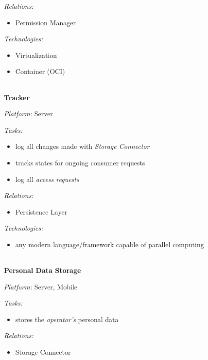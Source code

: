 \documentclass[12pt,english,a4paper,titlepage,cleardoublepage=empty,dottedtoc]{report}
\providecommand{\tightlist}{%
  \setlength{\itemsep}{0pt}\setlength{\parskip}{0pt}}
\begin{document}
\emph{Relations:}

\begin{itemize}
\tightlist
\item
  Permission Manager
\end{itemize}

\emph{Technologies:}

\begin{itemize}
\tightlist
\item
  Virtualization
\item
  Container (OCI)
\end{itemize}

~\\
\textbf{Tracker}

\emph{Platform:} Server

\emph{Tasks:}

\begin{itemize}
\tightlist
\item
  log all changes made with \emph{Storage Connector}
\item
  tracks states for ongoing consumer requests
\item
  log all \emph{access requests}
\end{itemize}

\emph{Relations:}

\begin{itemize}
\tightlist
\item
  Persistence Layer
\end{itemize}

\emph{Technologies:}

\begin{itemize}
\tightlist
\item
  any modern language/framework capable of parallel computing
\end{itemize}

~\\
\textbf{Personal Data Storage}

\emph{Platform:} Server, Mobile

\emph{Tasks:}

\begin{itemize}
\tightlist
\item
  stores the \emph{operator's} personal data
\end{itemize}

\emph{Relations:}

\begin{itemize}
\tightlist
\item
  Storage Connector
\end{itemize}
\end{document}
